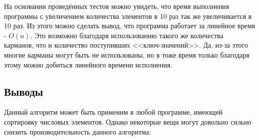 \documentclass[12pt]{article}
\begin{document}
На основании проведённых тестов можно увидеть, что время выполнения программы с увеличением количества элементов в 10 раз так же увеличивается в 10 раз.
Из этого можно сделать вывод, что программа работает за линейное время - $O(n)$. 
Это возможно благодаря использованию такого же количества карманов, что и количество поступивших <<ключ-значений>>. 
Да, из-за этого многие карманы могут быть не использованы, но в тоже время только благодаря этому можно добиться линейного времени исполнения.

\subsection*{Выводы}

Данный алгоритм может быть применим в любой программе, имеющей сортировку числовых элементов.
Однако некоторые вещи могут довольно сильно снизить производительность данного алгоритма:
\end{document}
